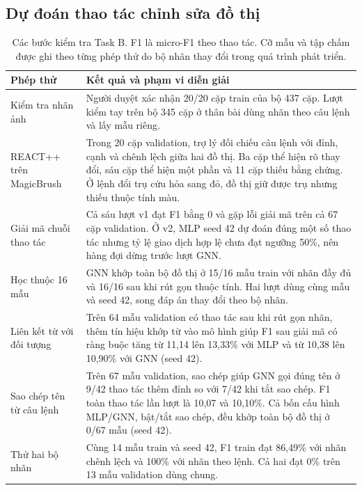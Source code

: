 \subsection{Dự đoán thao tác chỉnh sửa đồ thị}\label{app:probes}
\begin{table}[H]\centering\small
\caption{Các bước kiểm tra Task B. F1 là micro-F1 theo thao tác. Cỡ mẫu và
tập chấm được ghi theo từng phép thử do bộ nhãn thay đổi trong quá trình phát triển.}
\label{tab:edit-pilots}
\begin{tabular}{@{}p{.24\linewidth}p{.70\linewidth}@{}}\toprule
Phép thử & Kết quả và phạm vi diễn giải\\\midrule
Kiểm tra nhãn ảnh &
Người duyệt xác nhận 20/20 cặp train của bộ 437 cặp. Lượt kiểm tay trên
bộ 345 cặp ở thân bài dùng nhãn theo câu lệnh và lấy mẫu riêng.\\
REACT++ trên MagicBrush &
Trong 20 cặp validation, trợ lý đối chiếu câu lệnh với đỉnh, cạnh và chênh lệch giữa hai đồ thị.
Ba cặp thể hiện rõ thay đổi, sáu cặp thể hiện một phần và 11 cặp thiếu bằng chứng.
Ở lệnh đổi trụ cứu hỏa sang đỏ, đồ thị giữ được trụ nhưng thiếu thuộc tính màu.\\
Giải mã chuỗi thao tác &
Cả sáu lượt v1 đạt F1 bằng 0 và gặp lỗi giải mã trên cả 67 cặp validation.
Ở v2, MLP seed 42 dự đoán đúng một số thao tác nhưng tỷ lệ giao dịch hợp lệ
chưa đạt ngưỡng 50\%, nên hàng đợi dừng trước lượt GNN.\\
Học thuộc 16 mẫu &
GNN khớp toàn bộ đồ thị ở 15/16 mẫu train với nhãn đầy đủ và 16/16 sau khi rút
gọn thuộc tính. Hai lượt dùng cùng mẫu và seed 42, song đáp án thay đổi theo bộ nhãn.\\
Liên kết từ với đối tượng &
Trên 64 mẫu validation có thao tác sau khi rút gọn nhãn, thêm tín hiệu khớp từ
vào mô hình giúp F1 sau giải mã có ràng buộc tăng từ 11,14 lên 13,33\% với MLP
và từ 10,38 lên 10,90\% với GNN (seed 42).\\
Sao chép tên từ câu lệnh &
Trên 67 mẫu validation, sao chép giúp GNN gọi đúng tên ở 9/42 thao tác thêm đỉnh
so với 7/42 khi tắt sao chép. F1 toàn thao tác lần lượt là 10,07 và 10,10\%.
Cả bốn cấu hình MLP/GNN, bật/tắt sao chép, đều khớp toàn bộ đồ thị ở 0/67 mẫu (seed 42).\\
Thử hai bộ nhãn &
Cùng 14 mẫu train và seed 42, F1 train đạt 86,49\% với nhãn chênh lệch và
100\% với nhãn theo lệnh. Cả hai đạt 0\% trên 13 mẫu validation dùng chung.\\\bottomrule
\end{tabular}\end{table}

